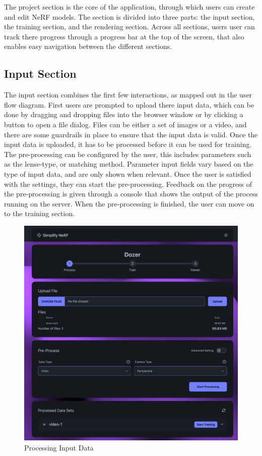 The project section is the core of the application, through which users can create and edit NeRF models.
The section is divided into three parts: the input section, the training section, and the rendering section.
Across all sections, users user can track there progress through a progress bar at the top of the screen, that also enables easy navigation between the different sections.

\subsection*{Input Section}

The input section combines the first few interactions, as mapped out in the user flow diagram.
First users are prompted to upload there input data, which can be done by dragging and dropping files into the browser window or by clicking a button to open a file dialog.
Files can be either a set of images or a video, and there are some guardrails in place to ensure that the input data is valid.
Once the input data is uploaded, it has to be processed before it can be used for training. 
The pre-processing can be configured by the user, this includes parameters such as the lense-type, or matching method.
Parameter input fields vary based on the type of input data, and are only shown when relevant.
Once the user is satisfied with the settings, they can start the pre-processing.
Feedback on the progress of the pre-processing is given through a console that shows the output of the process running on the server.
When the pre-processing is finished, the user can move on to the training section. 

\begin{figure}[htb]
  \includegraphics[width=\textwidth]{figures/view-process.png}
  \caption{Processing Input Data}
  \label{fig:design:input-section}
\end{figure}

